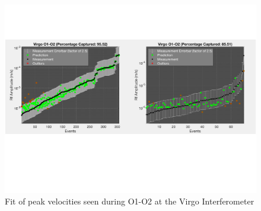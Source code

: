 \documentclass[twocolumn, aps, superscriptaddress]{revtex4}
\begin{document}
\begin{figure}[!htb]
\hspace*{-0.5cm}
 \includegraphics[width=\textwidth]{./plots/ClusteringPredictionVirgo.pdf}
 \caption{Fit of peak velocities seen during O1-O2 at the Virgo Interferometer}
 \label{fig:regression_Virgo}
\end{figure}

\end{document}
